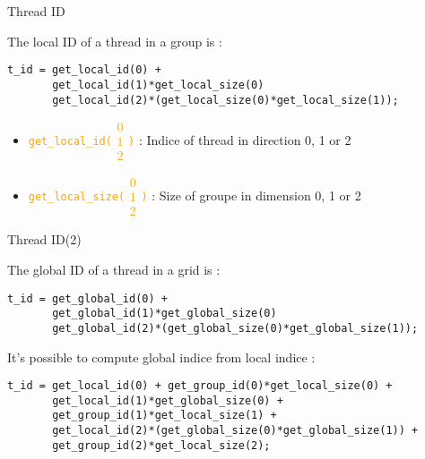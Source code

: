 \documentclass{beamer}
\begin{document}
\begin{frame}[containsverbatim]{Thread ID}

The local ID of a thread in a group is :
\begin{lstlisting}
t_id = get_local_id(0) + 
       get_local_id(1)*get_local_size(0)
       get_local_id(2)*(get_local_size(0)*get_local_size(1));
\end{lstlisting}

\begin{itemize}
\item \textcolor{orange}{\texttt{get\_local\_id({\tiny$\begin{array}{c}0\\1\\2\end{array}$})}} : 
  Indice of thread in direction 0, 1 or 2
\item \textcolor{orange}{\texttt{get\_local\_size({\tiny$\begin{array}{c}0\\1\\2\end{array}$})}} :
  Size of groupe in dimension 0, 1 or 2
\end{itemize}
\end{frame}

\begin{frame}[containsverbatim]{Thread ID(2)}

The global ID of a thread in a grid is :
\begin{lstlisting}
t_id = get_global_id(0) + 
       get_global_id(1)*get_global_size(0)
       get_global_id(2)*(get_global_size(0)*get_global_size(1));
\end{lstlisting}

It's possible to compute global indice from local indice :
\begin{lstlisting}
t_id = get_local_id(0) + get_group_id(0)*get_local_size(0) + 
       get_local_id(1)*get_global_size(0) + 
       get_group_id(1)*get_local_size(1) +
       get_local_id(2)*(get_global_size(0)*get_global_size(1)) +
       get_group_id(2)*get_local_size(2);
\end{lstlisting}
\end{frame}
\end{document}
